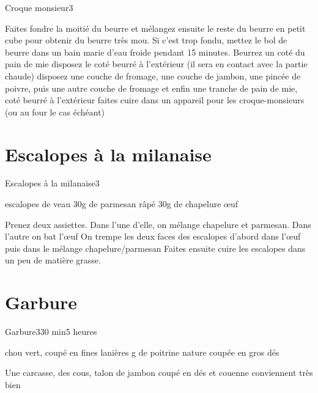 {\begin{recette}{Croque monsieur}{3}{}{}
\begin{preparation}
\etape Faites fondre la moitié du beurre et mélangez ensuite le reste du beurre en petit cube pour obtenir du beurre très mou. Si c'est trop fondu, mettez le bol de beurre dans un bain marie d'eau froide pendant 15 minutes.
\etape Beurrez un coté du pain de mie
\etape disposez le coté beurré à l'extérieur (il sera en contact avec la partie chaude)
\etape disposez une couche de fromage, une couche de jambon, une pincée de poivre, puis une autre couche de fromage et enfin une 
tranche de pain de mie, coté beurré à l'extérieur
\etape faites cuire dans un appareil pour les croque-monsieurs (ou au four le cas échéant)
\end{preparation}
\end{recette}

\section{Escalopes à la milanaise}
\begin{recette}{Escalopes à la milanaise}{3}{}{}
\begin{ingredients}
 escalopes de veau
\ingredient 30g de parmesan râpé
\ingredient 30g de chapelure
 œuf
\end{ingredients}

\begin{preparation}
\etape Prenez deux assiettes. Dans l'une d'elle, on mélange chapelure et parmesan. Dans l'autre on bat l'œuf
\etape On trempe les deux faces des escalopes d'abord dans l'œuf puis dans le mélange chapelure/parmesan
\etape Faites ensuite cuire les escalopes dans un peu de matière grasse.
\end{preparation}
\end{recette}


\section{Garbure}
\begin{recette}{Garbure}{3}{30 min}{5 heures}
\begin{ingredients}
 chou vert, coupé en fines lanières
 g de poitrine nature coupée en gros dés
\begin{remarque}
Une carcasse, des cous, talon de jambon coupé en dés et couenne conviennent très bien
\end{remarque}


\end{ingredients}
\end{recette}}
